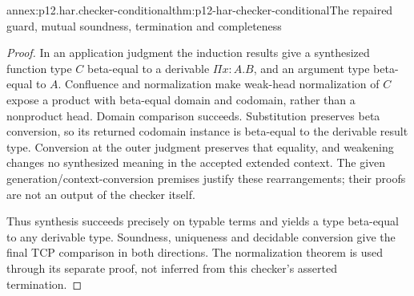 \begin{annexitem}{annex:p12.har.checker-conditional}{thm:p12-har-checker-conditional}{The repaired guard, mutual soundness, termination and completeness}
\begin{proof}
In an application judgment the induction results give a synthesized
function type \(C\) beta-equal to a derivable
\(\Pi x:A.B\), and an argument type beta-equal to \(A\).
Confluence and normalization make weak-head normalization of \(C\)
expose a product with beta-equal domain and codomain, rather than a
nonproduct head. Domain comparison succeeds. Substitution preserves
beta conversion, so its returned codomain instance is beta-equal to
the derivable result type. Conversion at the outer judgment preserves
that equality, and weakening changes no synthesized meaning in the
accepted extended context. The given generation/context-conversion
premises justify these rearrangements; their proofs are not an output
of the checker itself.

Thus synthesis succeeds precisely on typable terms and yields a type
beta-equal to any derivable type. Soundness, uniqueness and decidable
conversion give the final TCP comparison in both directions. The
normalization theorem is used through its separate proof, not inferred
from this checker's asserted termination.
\end{proof}
\end{annexitem}

